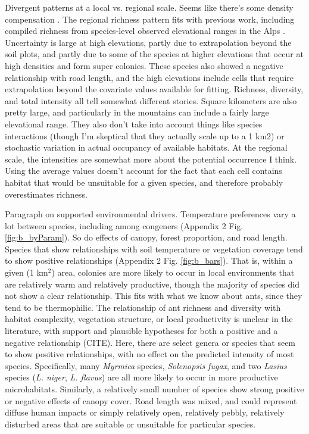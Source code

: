 \documentclass[preprint,review,times,12pt,3p]{elsarticle}
\begin{document}
Divergent patterns at a local vs. regional scale. Seems like there's some density compensation \citep{LongColw2011}. The regional richness pattern fits with previous work, including compiled richness from species-level observed elevational ranges in the Alps \citep{Hellrigl2003,Glaser2006,SzewczykMcCain2016,Szewczyk2018}. Uncertainty is large at high elevations, partly due to extrapolation beyond the soil plots, and partly due to some of the species at higher elevations that occur at high densities and form super colonies. These species also showed a negative relationship with road length, and the high elevations include cells that require extrapolation beyond the covariate values available for fitting. Richness, diversity, and total intensity all tell somewhat different stories. Square kilometers are also pretty large, and particularly in the mountains can include a fairly large elevational range. They also don't take into account things like species interactions (though I'm skeptical that they actually scale up to a 1 km2) or stochastic variation in actual occupancy of available habitats. At the regional scale, the intensities are somewhat more about the potential occurrence I think. Using the average values doesn't account for the fact that each cell contains habitat that would be unsuitable for a given species, and therefore probably overestimates richness.

Paragraph on supported environmental drivers. Temperature preferences vary a lot between species, including among congeners (Appendix 2 Fig. \ref{fig:b_byParam}). So do effects of canopy, forest proportion, and road length. Species that show relationships with soil temperature or vegetation coverage tend to show positive relationships (Appendix 2 Fig. \ref{fig:b_bars}). That is, within a given (1 km$^2$) area, colonies are more likely to occur in local environments that are relatively warm and relatively productive, though the majority of species did not show a clear relationship. This fits with what we know about ants, since they tend to be thermophilic. The relationship of ant richness and diversity with habitat complexity, vegetation structure, or local productivity is unclear in the literature, with support and plausible hypotheses for both a positive and a negative relationship (CITE). Here, there are select genera or species that seem to show positive relationships, with no effect on the predicted intensity of most species. Specifically, many \emph{Myrmica} species, \emph{Solenopsis fugax}, and two \emph{Lasius} species (\emph{L. niger}, \emph{L. flavus}) are all more likely to occur in more productive microhabitats. Similarly, a relatively small number of species show strong positive or negative effects of canopy cover. Road length was mixed, and could represent diffuse human impacts or simply relatively open, relatively pebbly, relatively disturbed areas that are suitable or unsuitable for particular species.
\end{document}

